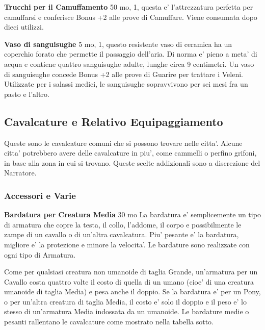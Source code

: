 \documentclass[a4paper,11pt,twoside,openany]{book}
\begin{document}
{		\textbf{Trucchi per il Camuffamento} 50 mo, 1, questa e' l'attrezzatura perfetta per camuffarsi e conferisce Bonus +2 alle prove di Camuffare. Viene consumata dopo dieci utilizzi.
		
		\textbf{Vaso di sanguisughe} 5 mo, 1, questo resistente vaso di ceramica ha un coperchio forato che permette il passaggio dell'aria. Di norma e' pieno a meta' di acqua e contiene quattro sanguisughe adulte, lunghe circa 9 centimetri.
		Un vaso di sanguisughe concede Bonus +2 alle prove di Guarire per trattare i Veleni. Utilizzate per i salassi medici, le sanguisughe sopravvivono per sei mesi fra un pasto e l'altro.
		
		\pagebreak
		
		\subsection{Cavalcature e Relativo Equipaggiamento}
		
		\label{cavalcature-e-relativo-equipaggiamento}
		
		Queste sono le cavalcature comuni che si possono trovare nelle citta'. Alcune citta' potrebbero avere delle cavalcature in piu', come cammelli o perfino grifoni, in base alla zona in cui si trovano. Queste scelte addizionali sono a discrezione del Narratore.
		
		\subsubsection{Accessori e Varie}
		
		\label{accessori-e-varie}
		
		\textbf{Bardatura per Creatura Media} 30 mo La bardatura e' semplicemente un tipo di armatura che copre la testa, il collo, l'addome, il corpo e possibilmente le zampe di un cavallo o di un'altra cavalcatura. Piu' pesante e' la bardatura, migliore e' la protezione e minore la velocita'. Le bardature sono realizzate con ogni tipo di Armatura.
		
		Come per qualsiasi creatura non umanoide di taglia Grande, un'armatura per un Cavallo costa quattro volte il costo di quella di un umano (cioe' di una creatura umanoide di taglia Media) e pesa anche il doppio. Se la bardatura e' per un Pony, o per un'altra creatura di taglia Media, il costo e' solo il doppio e il peso e' lo stesso di un'armatura Media indossata da un umanoide. Le bardature medie o pesanti rallentano le cavalcature come mostrato nella tabella sotto.
		
}
\end{document}
